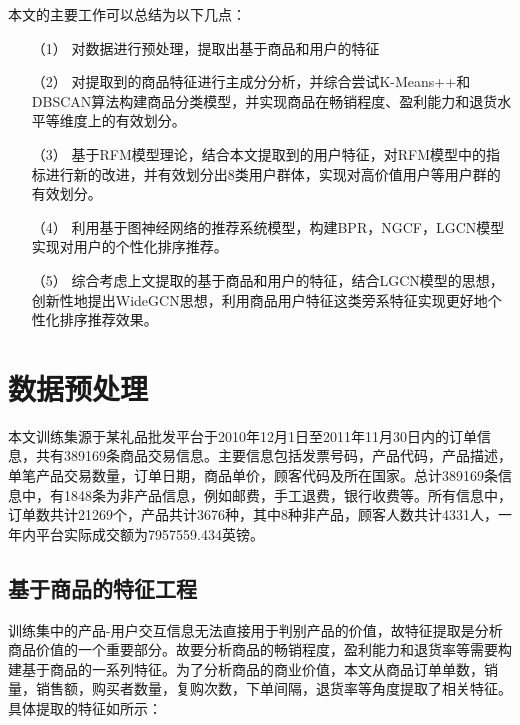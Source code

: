 \documentclass[lang=cn,11pt,a4paper,cite=authoryear]{elegantpaper}
\begin{document}
本文的主要工作可以总结为以下几点：

\begin{itemize}
  \item [（1）] 
  对数据进行预处理，提取出基于商品和用户的特征
  \item [（2）]
  对提取到的商品特征进行主成分分析，并综合尝试K-Means++和DBSCAN算法构建商品分类模型，并实现商品在畅销程度、盈利能力和退货水平等维度上的有效划分。
  \item [（3）]
  基于RFM模型理论，结合本文提取到的用户特征，对RFM模型中的指标进行新的改进，并有效划分出8类用户群体，实现对高价值用户等用户群的有效划分。
  \item[（4）]
  利用基于图神经网络的推荐系统模型，构建BPR，NGCF，LGCN模型实现对用户的个性化排序推荐。
  \item[（5）]
  综合考虑上文提取的基于商品和用户的特征，结合LGCN模型的思想，创新性地提出WideGCN思想，利用商品用户特征这类旁系特征实现更好地个性化排序推荐效果。 
\end{itemize}

\section{数据预处理}

本文训练集源于某礼品批发平台于2010年12月1日至2011年11月30日内的订单信息，共有389169条商品交易信息。主要信息包括发票号码，产品代码，产品描述，单笔产品交易数量，订单日期，商品单价，顾客代码及所在国家。总计389169条信息中，有1848条为非产品信息，例如邮费，手工退费，银行收费等。所有信息中，订单数共计21269个，产品共计3676种，其中8种非产品，顾客人数共计4331人，一年内平台实际成交额为7957559.434英镑。

\subsection{基于商品的特征工程}

训练集中的产品-用户交互信息无法直接用于判别产品的价值，故特征提取是分析商品价值的一个重要部分。故要分析商品的畅销程度，盈利能力和退货率等需要构建基于商品的一系列特征。为了分析商品的商业价值，本文从商品订单单数，销量，销售额，购买者数量，复购次数，下单间隔，退货率等角度提取了相关特征。具体提取的特征如所示：
\end{document}
